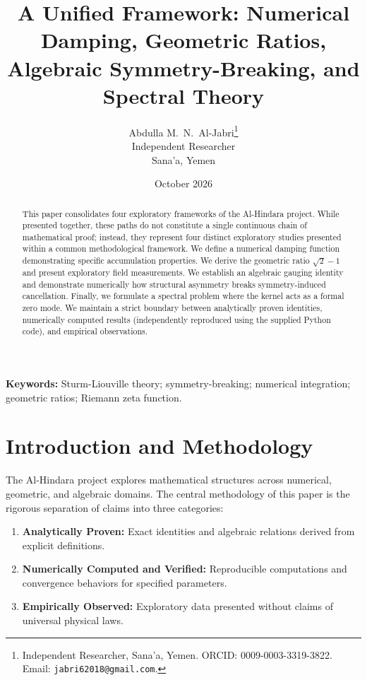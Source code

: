 \documentclass[11pt,a4paper]{article}
\title{\textbf{A Unified Framework: Numerical Damping, Geometric Ratios,\\
Algebraic Symmetry-Breaking, and Spectral Theory}}
\author{
    Abdulla M.~N.~Al-Jabri\thanks{Independent Researcher, Sana'a, Yemen. ORCID: 0009-0003-3319-3822. Email: \texttt{jabri62018@gmail.com}.} \\
    \small Independent Researcher \\
    \small Sana'a, Yemen
}
\date{October 2026}
\begin{document}
\maketitle
\thispagestyle{plain}

\begin{abstract}
This paper consolidates four exploratory frameworks of the Al-Hindara project. While presented together, these paths do not constitute a single continuous chain of mathematical proof; instead, they represent four distinct exploratory studies presented within a common methodological framework. We define a numerical damping function demonstrating specific accumulation properties. We derive the geometric ratio \(\sqrt{2}-1\) and present exploratory field measurements. We establish an algebraic gauging identity and demonstrate numerically how structural asymmetry breaks symmetry-induced cancellation. Finally, we formulate a spectral problem where the kernel acts as a formal zero mode. We maintain a strict boundary between analytically proven identities, numerically computed results (independently reproduced using the supplied Python code), and empirical observations.
\end{abstract}

\vspace{1em}
\noindent\textbf{Keywords:} Sturm-Liouville theory; symmetry-breaking; numerical integration; geometric ratios; Riemann zeta function.

\tableofcontents
\vspace{1em}
\newpage

\section{Introduction and Methodology}
\label{sec:intro}

The Al-Hindara project explores mathematical structures across numerical, geometric, and algebraic domains. The central methodology of this paper is the rigorous separation of claims into three categories:
\begin{enumerate}
    \item \textbf{Analytically Proven:} Exact identities and algebraic relations derived from explicit definitions.
    \item \textbf{Numerically Computed and Verified:} Reproducible computations and convergence behaviors for specified parameters.
    \item \textbf{Empirically Observed:} Exploratory data presented without claims of universal physical laws.
\end{enumerate}
\end{document}
